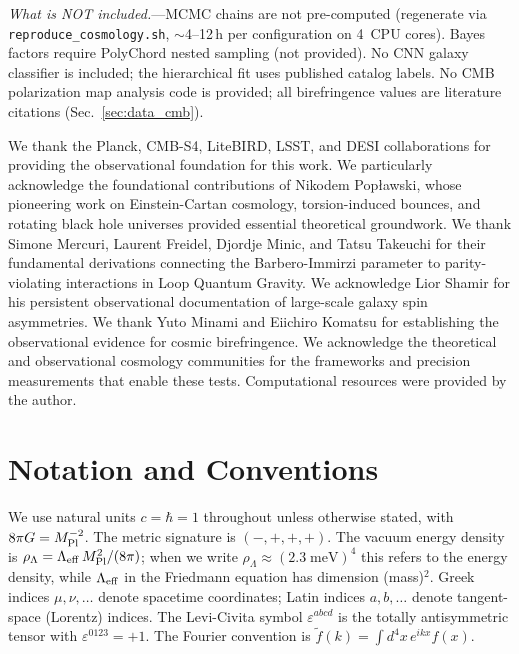 \documentclass[aps,prd,twocolumn,superscriptaddress,showpacs,preprintnumbers,nofootinbib,longbibliography,floatfix]{revtex4-2}
\newcommand{\Leff}{\Lambda_{\rm eff}}
\newcommand{\MPl}{M_{\rm Pl}}
\begin{document}
\noindent \textit{What is NOT included.}---MCMC chains are not pre-computed (regenerate via \texttt{reproduce\_cosmology.sh}, $\sim$4--12\,h per configuration on 4~CPU cores). Bayes factors require PolyChord nested sampling (not provided). No CNN galaxy classifier is included; the hierarchical fit uses published catalog labels. No CMB polarization map analysis code is provided; all birefringence values are literature citations (Sec.~\ref{sec:data_cmb}).


\begin{acknowledgments}
We thank the Planck, CMB-S4, LiteBIRD, LSST, and DESI collaborations for providing the observational foundation for this work. We particularly acknowledge the foundational contributions of Nikodem Pop\l{}awski, whose pioneering work on Einstein-Cartan cosmology, torsion-induced bounces, and rotating black hole universes provided essential theoretical groundwork. We thank Simone Mercuri, Laurent Freidel, Djordje Minic, and Tatsu Takeuchi for their fundamental derivations connecting the Barbero-Immirzi parameter to parity-violating interactions in Loop Quantum Gravity. We acknowledge Lior Shamir for his persistent observational documentation of large-scale galaxy spin asymmetries. We thank Yuto Minami and Eiichiro Komatsu for establishing the observational evidence for cosmic birefringence. We acknowledge the theoretical and observational cosmology communities for the frameworks and precision measurements that enable these tests. Computational resources were provided by the author.
\end{acknowledgments}


\appendix

\section{Notation and Conventions}\label{app:notation}

We use natural units $c=\hbar=1$ throughout unless otherwise stated, with $8\pi G = \MPl^{-2}$. The metric signature is $(-,+,+,+)$. The vacuum energy density is $\rho_\Lambda = \Leff\,\MPl^2/(8\pi)$; when we write $\rho_\Lambda \approx (2.3\;\text{meV})^4$ this refers to the energy density, while $\Leff$ in the Friedmann equation has dimension (mass)$^2$. Greek indices $\mu,\nu,\ldots$ denote spacetime coordinates; Latin indices $a,b,\ldots$ denote tangent-space (Lorentz) indices. The Levi-Civita symbol $\varepsilon^{abcd}$ is the totally antisymmetric tensor with $\varepsilon^{0123}=+1$. The Fourier convention is $\tilde{f}(k) = \int d^4x\,e^{ikx}f(x)$.
\end{document}
